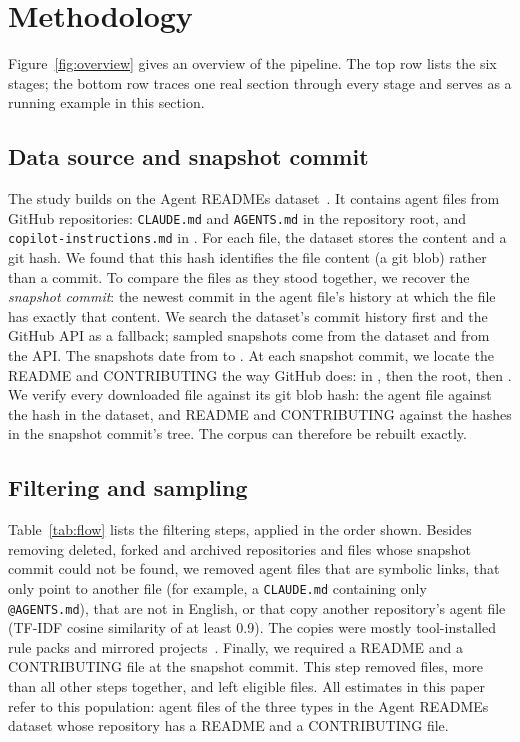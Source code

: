 \documentclass[sigconf,nonacm]{acmart}
\begin{document}
\section{Methodology}\label{sec:method}

Figure~\ref{fig:overview} gives an overview of the pipeline. The top row lists the six stages; the
bottom row traces one real section through every stage and serves as a running example in this
section.

\subsection{Data source and snapshot commit}

The study builds on the Agent READMEs dataset~\cite{chatlatanagulchai2026agentreadmes}. It contains
\nPackageFiles{} agent files from \nPackageRepos{} GitHub repositories: \texttt{CLAUDE.md} and
\texttt{AGENTS.md} in the repository root, and \texttt{copilot-instructions.md} in .
For each file, the dataset stores the content and a git hash. We found that this hash identifies
the file content (a git blob) rather than a commit. To compare the files as they stood together, we
recover the \emph{snapshot commit}: the newest commit in the agent file's history at which the file
has exactly that content. We search the dataset's commit history first and the GitHub API as a
fallback; \nSnapshotPackage{} sampled snapshots come from the dataset and \nSnapshotAPI{} from the
API. The snapshots date from \snapshotFirst{} to \snapshotLast. At each snapshot commit, we locate
the README and CONTRIBUTING the way GitHub does: in , then the root, then
. We verify every downloaded file against its git blob hash: the agent file against the
hash in the dataset, and README and CONTRIBUTING against the hashes in the snapshot commit's tree.
The corpus can therefore be rebuilt exactly.

\subsection{Filtering and sampling}\label{sec:sampling}

Table~\ref{tab:flow} lists the filtering steps, applied in the order shown. Besides removing
deleted, forked and archived repositories and files whose snapshot commit could not be found, we
removed agent files that are symbolic links, that only point to another file (for example, a
\texttt{CLAUDE.md} containing only \texttt{@AGENTS.md}), that are not in English, or that copy
another repository's agent file (TF-IDF cosine similarity of at least 0.9). The
\nDuplicateDropped{} copies were mostly tool-installed rule packs and mirrored
projects~\cite{hata2021metamaintenance}. Finally, we required a README and a CONTRIBUTING file at the
snapshot commit. This step removed \nDroppedNoContributing{} files, more than all other steps
together, and left \nEligible{} eligible files. All estimates in this paper refer to this
population: agent files of the three types in the Agent READMEs dataset whose repository has a
README and a CONTRIBUTING file.
\end{document}
